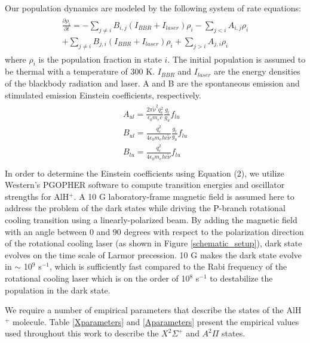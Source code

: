 \documentclass[nofootinbib,aip,jcp,reprint]{revtex4-1}
\begin{document}
Our population dynamics are modeled by the following system of rate equations:
\begin{align}
\begin{aligned}
\frac{\partial\rho_i}{\partial t}=-\sum_{j\neq i}B_{i,j}(I_{BBR}+I_{laser})\rho_i - \sum_{j<i}A_{i,j}\rho_i \\
+\sum_{j\neq i}B_{j,i}(I_{BBR}+I_{laser})\rho_i + \sum_{j>i}A_{j,i}\rho_i 
\end{aligned}
\end{align}
where $\rho_i$ is the population fraction in state $i$. The initial population is assumed to be thermal with a temperature of 300 K. $I_{BBR}$ and $I_{laser}$ are the energy densities of the blackbody radiation and laser. A and B are the spontaneous emission and stimulated emission Einstein coefficients, respectively.
\begin{align}
\begin{aligned}
A_{ul} = \frac{2\pi \widetilde{\nu}^2 q_e^2}{\epsilon_0 m_e c} \frac{g_l}{g_u} f_{lu}\\
B_{ul} = \frac{q_e^2}{4 \epsilon_0 m_e h c \widetilde{\nu}} \frac{g_l}{g_u} f_{lu} \\
B_{lu} = \frac{q_e^2}{4 \epsilon_0 m_e h c \widetilde{\nu}} f_{lu}\\
\end{aligned}
\end{align}
In order to determine the Einstein coefficients using Equation (2), we utilize Western's PGOPHER\cite{western2017pgopher} software to compute transition energies and oscillator strengths for AlH$^+$. A 10 G laboratory-frame magnetic field is assumed here to address the problem of the dark states while driving the P-branch rotational cooling transition using a linearly-polarized beam. By adding the magnetic field with an angle between 0 and 90 degrees with respect to the polarization direction of the rotational cooling laser (as shown in Figure \ref{schematic_setup}), dark state evolves on the time scale of Larmor precession. 10 G makes the dark state evolve in $\sim$ 10$^9$ s$^{-1}$, which is sufficiently fast compared to the Rabi frequency of the rotational cooling laser which is on the order of 10$^8$ s$^{-1}$ to destabilize the population in the dark state.

We require a number of empirical parameters that describe the states of the AlH$^+$ molecule. Table \ref{Xparameters} and \ref{Aparameters} present the empirical values used throughout this work to describe the $X^2 \Sigma^{+}$  and $A^2\Pi$ states.
\end{document}
